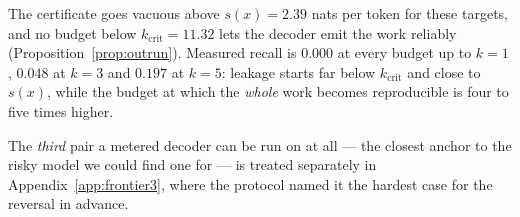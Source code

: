 The certificate goes vacuous above $s(x) = 2.39$ nats per token for these targets, and no budget
below $k_{\mathrm{crit}} = 11.32$ lets the decoder emit the work reliably
(Proposition~\ref{prop:outrun}). Measured recall is $0.000$ at every budget
up to $k=1$, $0.048$ at $k=3$ and $0.197$ at $k=5$: leakage starts far below $k_{\mathrm{crit}}$ and
close to $s(x)$, while the budget at which the \emph{whole} work becomes reproducible is four to
five times higher.

\noindent The \emph{third} pair a metered decoder can be run on at all --- the closest anchor to
the risky model we could find one for --- is treated separately in
Appendix~\ref{app:frontier3}, where the protocol named it the hardest case for the reversal in
advance.
